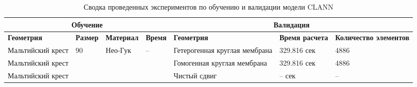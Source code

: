 \begin{table}[htbp]
\centering
\caption{Сводка проведенных экспериментов по обучению и валидации модели CLANN}
\label{tab:experiments_summary}
\begin{tabular}{|p{2.3cm}|p{2.2cm}|p{2.2cm}|p{1.3cm}|p{2.3cm}|p{1.5cm}|p{2.5cm}|}
\hline
\multicolumn{4}{|c|}{\textbf{Обучение}} & \multicolumn{3}{c|}{\textbf{Валидация}} \\
\hline
\textbf{Геометрия} & \textbf{Размер} & \textbf{Материал} & \textbf{Время} & \textbf{Геометрия} & \textbf{Время расчета} & \textbf{Количество элементов} \\
\hline
Мальтийский крест & 90 & Нео-Гук & -- & Гетерогенная круглая мембрана  & 329.816 сек & 4886 \\
\hline
Мальтийский крест & & & & Гомогенная круглая мембрана  & 329.816 сек & 4886  \\
\hline
Мальтийский крест & & & & Чистый сдвиг & -- сек & -- \\
\hline
\end{tabular}
\end{table}







